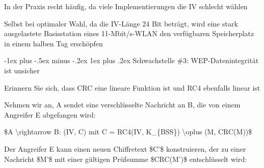 \documentclass[a4paper]{article}
\makeatletter
\renewcommand{\subsubsection}{\@startsection{subsubsection}{3}{0mm}%
 {-1ex plus -.5ex minus -.2ex}%
 {1ex plus .2ex}%
 {\normalfont\small\bfseries}}
\makeatother
\begin{document}
\begin{multicols}{3}
\begin{itemize*}
            \begin{itemize*}
                  \item In der Praxis recht häufig, da viele Implementierungen die IV schlecht wählen
                  \item Selbst bei optimaler Wahl, da die IV-Länge 24 Bit beträgt, wird eine stark ausgelastete Basisstation eines 11-Mbit/s-WLAN den verfügbaren Speicherplatz in einem halben Tag erschöpfen
            \end{itemize*}
      \end{itemize*}


      \subsubsection{Schwachstelle \#3: WEP-Datenintegrität ist
            unsicher}

      \begin{itemize*}
            \item
            Erinnern Sie sich, dass CRC eine lineare Funktion ist und RC4
            ebenfalls linear ist
            \item
            Nehmen wir an, A sendet eine verschlüsselte Nachricht an B, die von
            einem Angreifer E abgefangen wird:

            \begin{itemize*}
                  \item \$A \textbackslash rightarrow B: (IV, C) mit C = RC4(IV, K\_\{BSS\}) \textbackslash oplus (M, CRC(M))\$
            \end{itemize*}
            \item
            Der Angreifer E kann einen neuen Chiffretext \$C'\$ konstruieren, der
            zu einer Nachricht \$M'\$ mit einer gültigen Prüfsumme \$CRC(M')\$
            entschlüsselt wird:


\end{itemize*}
\end{multicols}
\end{document}
